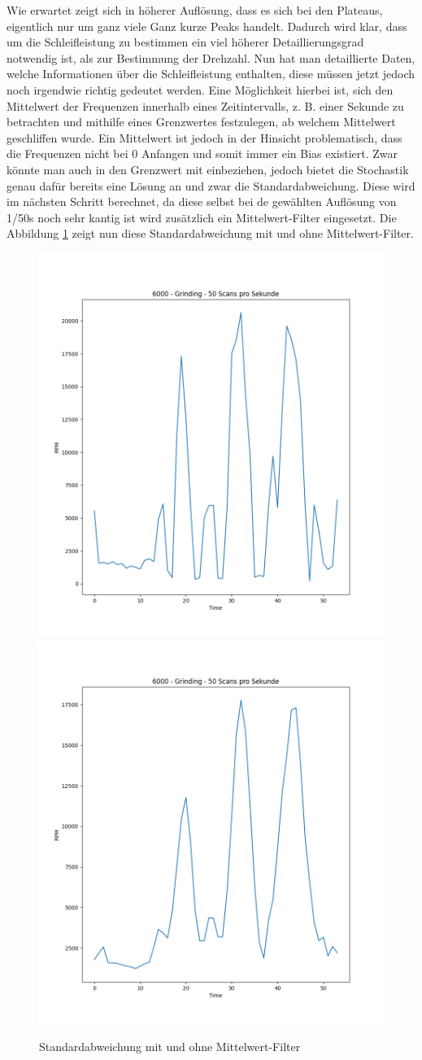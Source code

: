 Wie erwartet zeigt sich in höherer Auflösung, dass es sich bei den Plateaus, eigentlich nur um ganz viele Ganz kurze Peaks handelt. Dadurch wird klar, dass um die Schleifleistung zu bestimmen ein viel höherer Detaillierungsgrad notwendig ist, als zur Bestimmung der Drehzahl. Nun hat man   detaillierte Daten, welche Informationen über die Schleifleistung enthalten, diese müssen jetzt jedoch noch irgendwie richtig gedeutet werden. Eine Möglichkeit hierbei ist, sich den Mittelwert der Frequenzen innerhalb eines Zeitintervalls, z. B. einer Sekunde zu betrachten und mithilfe eines Grenzwertes festzulegen, ab welchem Mittelwert geschliffen wurde. Ein Mittelwert ist jedoch in der Hinsicht problematisch, dass die Frequenzen nicht bei 0 Anfangen und somit immer ein Bias existiert. Zwar könnte man auch in den Grenzwert mit einbeziehen, jedoch bietet die Stochastik genau dafür bereits eine Lösung an und zwar die Standardabweichung. Diese wird im nächsten Schritt berechnet, da diese selbst bei de gewählten Auflösung von 1/50s noch sehr kantig ist wird zusätzlich ein Mittelwert-Filter eingesetzt. Die Abbildung \ref{fig:cwt-std-mit-und-ohne-mittelwert-filter} zeigt nun diese Standardabweichung mit und ohne Mittelwert-Filter. 

\begin{figure}[H]
    \includegraphics[width=0.5\linewidth]{Studienarbeit//images/cwt-6000-grinding-std.png} 
    \includegraphics[width=0.5\linewidth]{Studienarbeit//images/cwt-6000-grinding-std-mw.png} 
    \caption{Standardabweichung mit und ohne Mittelwert-Filter}
    \label{fig:cwt-std-mit-und-ohne-mittelwert-filter}
\end{figure}

